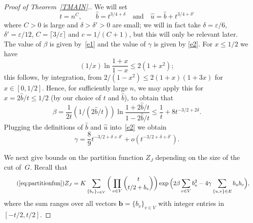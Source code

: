 \documentclass[11pt]{article}
\newcommand{\eps}{\varepsilon}
\begin{document}
\begin{proof}[Proof of Theorem~\ref{TMAIN}.]
We will set
$$
t = n^C, \quad\quad \hat{b}=t^{3/4+\delta}\quad\mbox{and}\quad \hat{u} = \hat{b} + t^{3/4+\delta'} 
$$
where $C>0$ is large and $\delta>\delta'>0$ are small; we will in fact take $\delta=\eps/6$, $\delta'=\eps/12$, $C=\lceil 3/\eps\rceil$ and $c=1/(C+1)$, but this will only be relevant later. The value of $\beta$ is given by~\eqref{e1} and the value of $\gamma$ is given by \eqref{e2}.
For $x\leq 1/2$ we have
$$
(1/x) \ln \frac{1+x}{1-x}\leq 2(1 + x^2);
$$
this follows, by integration, from $2/(1-x^2)\leq 2(1+x)(1+3x)$ for $x\in [0,1/2]$. Hence, for sufficiently large $n$, we may apply this for $x=2\hat{b}/t\leq 1/2$ (by our choice of $t$ and $\hat{b}$), to obtain that
\begin{equation}\label{ALUPE}
\beta = \frac{1}{2t} (1/(2\hat{b}/t)) \ln \frac{1+2\hat{b}/t}{1-2\hat{b}/t}\leq \frac{1}{t} + 8 t^{-3/2+ 2\delta}.
\end{equation}
Plugging the definitions of $\hat{b}$ and $\hat{u}$ into~\eqref{e2} we obtain
\begin{equation}\label{GASY}
\gamma = \frac{8}{9} t^{-3/2 + \delta + \delta'} + o( t^{-3/2 + \delta + \delta'}).
\end{equation}


We next give bounds on the partition function $Z_J$ depending on the size of the cut of~$G$. Recall that 
\begin{equation*}\tag{\ref{eq:partitionfun}}
Z_J = K\sum_{\{b_v\}_{v\in V}} \bigg( \prod_{v\in V} {t\choose t/2 + b_v}\bigg) \exp\Big( 2\beta \sum_{v\in V} b_v^2 - 4 \gamma \sum_{\{u,v\}\in E} b_u b_v \Big),
\end{equation*}
where the sum ranges over all vectors $\mathbf{b}=\{b_v\}_{v\in V}$ with integer entries in $[-t/2,t/2]$. 



\end{proof}
\end{document}
